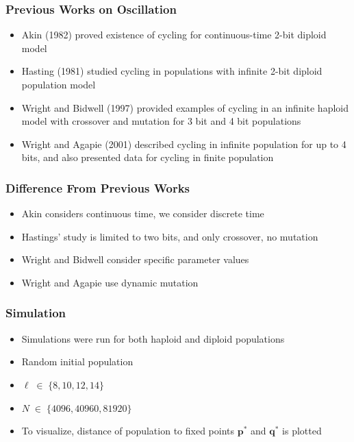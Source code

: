 \documentclass[aspectratio=169]{beamer}
\begin{document}
  \begin{frame}
    \frametitle{Previous Works on Oscillation}
    \begin{itemize}
      \setlength\itemsep{1em}
      \item{Akin (1982) proved existence of cycling for continuous-time 2-bit diploid model}  
      
      \item{Hasting (1981) studied cycling in populations with infinite 2-bit diploid population model}
      \item{Wright and Bidwell (1997) provided examples of cycling in an infinite haploid model 
      with crossover and mutation for 3 bit and 4 bit populations }
      \item{Wright and Agapie (2001) described cycling in infinite population for up to 4 bits, 
      and also presented data for cycling in finite population}
    \end{itemize}    
  \end{frame}
  
  \begin{frame}
    \frametitle{Difference From Previous Works}
    \begin{itemize}
      \setlength\itemsep{1em}
      \item{Akin considers continuous time, we consider discrete time}
      \item{Hastings' study is limited to two bits, and only crossover, no mutation}
      \item{Wright and Bidwell consider specific parameter values}
      \item{Wright and Agapie use dynamic mutation}      
    \end{itemize}
  \end{frame}
  
  \begin{frame}
    \frametitle{Simulation}
    \begin{itemize}
      \setlength\itemsep{1em}
      \item{Simulations were run for both haploid and diploid populations}
      \item{Random initial population}     
      \item{$\ell \;\in\; \{8, 10, 12, 14\}$}
      \item{$N \;\in\; \{4096, 40960, 81920\}$}
      \item{To visualize, distance of population to fixed points $\bm{p}^\ast$ and $\bm{q}^\ast$ is plotted}
    \end{itemize}
  \end{frame}
  
\end{document}
